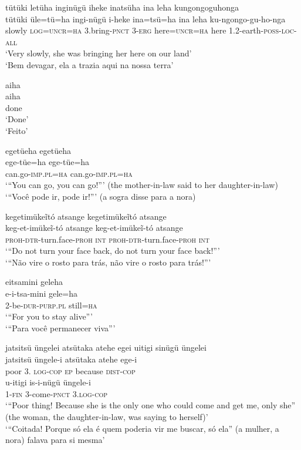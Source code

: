 \documentclass[output=paper,
modfonts,nonflat
]{langsci/langscibook}
\begin{document}
\ea tütüki letüha inginügü iheke inatsüha ina leha kungongoguhonga \\[.3em]
\gll tütüki üle=tü=ha ingi-nügü i-heke ina=tsü=ha ina leha ku-ngongo-gu-ho-nga \\
slowly \textsc{log=uncr=ha} 3.bring-\textsc{pnct} \textsc{3-erg} here=\textsc{uncr=ha} here 1.2-earth\textsc{-poss-loc-all} \\
\glt ‘Very slowly, she was bringing her here on our land’ \\
‘Bem devagar, ela a trazia aqui na nossa terra’ \\
\z

 
\ea aiha \\[.3em]
\gll aiha \\
done \\
\glt ‘Done’ \\
‘Feito’ \\
\z

\ea egetüeha egetüeha \\[.3em]
\gll ege-tüe=ha ege-tüe=ha \\
can.go-\textsc{imp.pl=ha} can.go\textsc{-imp.pl=ha} \\ 
\glt ‘“You can go, you can go!”’ (the mother-in-law said to her daughter-in-law) \\
‘“Você pode ir, pode ir!”’ (a sogra disse para a nora) \\
\z

\ea kegetimükeĩtó atsange kegetimükeĩtó atsange \\[.3em]
\gll keg-et-imükeĩ-tó atsange keg-et-imükeĩ-tó atsange \\
\textsc{proh-dtr-}turn.face-\textsc{proh} \textsc{int} \textsc{proh-dtr-}turn.face-\textsc{proh} \textsc{int} \\
\glt ‘“Do not turn your face back, do not turn your face back!”’ \\
‘“Não vire o rosto para trás, não vire o rosto para trás!”’ \\
 \z

\ea eitsamini geleha \\[.3em]
\gll e-i-tsa-mini gele=ha \\
2-be-\textsc{dur-purp.pl} still=\textsc{ha}  \\
\glt ‘“For you to stay alive”’ \\
‘“Para você permanecer viva”’ \\
\z

\ea jatsitsü üngelei atsütaka atehe egei uitigi sinügü üngelei \\[.3em]
\gll jatsitsü üngele-i atsütaka atehe ege-i  \\
poor 3. \textsc{log-cop} \textsc{ep} because \textsc{dist-cop} \\
\gll u-itigi is-i-nügü üngele-i \\
\textsc{1-fin} 3-come-\textsc{pnct} \textsc{3.log-cop} \\
\glt ‘“Poor thing! Because she is the only one who could come and get me, only she” (the woman, the daughter-in-law, was saying to herself)’ \\
‘“Coitada! Porque só ela é quem poderia vir me buscar, só ela” (a mulher, a nora) falava para si mesma’ \\
\z
\end{document}
